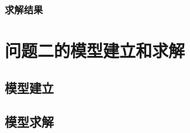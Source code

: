 \documentclass[withoutpreface,bwprint]{cumcmthesis}
\begin{document}





\subsubsection{求解结果}


\section{问题二的模型建立和求解}
\subsection{模型建立}





\subsection{模型求解}



\end{document}
